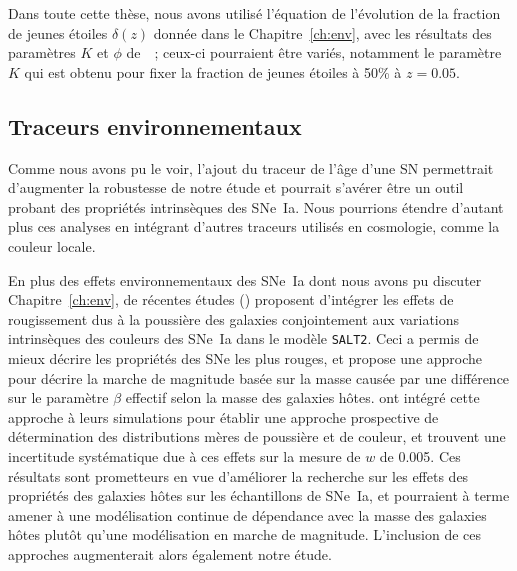 \documentclass[../main/main.tex]{subfiles}
\begin{document}
Dans toute cette thèse, nous avons utilisé l'équation de l'évolution de la
fraction de jeunes étoiles $\delta(z)$ donnée dans le Chapitre~\ref{ch:env},
avec les résultats des paramètres $K$ et $\phi$ de~\cite{rigault2020}~; ceux-ci
pourraient être variés, notamment le paramètre $K$ qui est obtenu pour fixer la
fraction de jeunes étoiles à 50\% à $z = \num{0.05}$.

\subsection{Traceurs environnementaux}\label{ssec:envtrac}

Comme nous avons pu le voir, l'ajout du traceur de l'âge d'une SN permettrait
d'augmenter la robustesse de notre étude et pourrait s'avérer être un outil
probant des propriétés intrinsèques des SNe~Ia. Nous pourrions étendre d'autant
plus ces analyses en intégrant d'autres traceurs utilisés en cosmologie, comme
la couleur locale.

En plus des effets environnementaux des SNe~Ia dont nous avons pu discuter
Chapitre~\ref{ch:env}, de récentes études (\cite{brout2021}) proposent
d'intégrer les effets de rougissement dus à la poussière des galaxies
conjointement aux variations intrinsèques des couleurs des SNe~Ia dans le modèle
\texttt{SALT2}. Ceci a permis de mieux décrire les propriétés des SNe les plus
rouges, et propose une approche pour décrire la marche de magnitude basée sur la
masse causée par une différence sur le paramètre $\beta$ effectif selon la masse
des galaxies hôtes. \cite{popovic2021b} ont intégré cette approche à leurs
simulations pour établir une approche prospective de détermination des
distributions mères de poussière et de couleur, et trouvent une incertitude
systématique due à ces effets sur la mesure de $w$ de \num{0.005}. Ces résultats
sont prometteurs en vue d'améliorer la recherche sur les effets des propriétés
des galaxies hôtes sur les échantillons de SNe~Ia, et pourraient à terme amener
à une modélisation continue de dépendance avec la masse des galaxies hôtes
plutôt qu'une modélisation en marche de magnitude. L'inclusion de ces approches
augmenterait alors également notre étude.

\clearpage

\thispagestyle{plain}
\vfill
\minilof
\vfill
\minilot
\vfill

% 
% 
\end{document}
